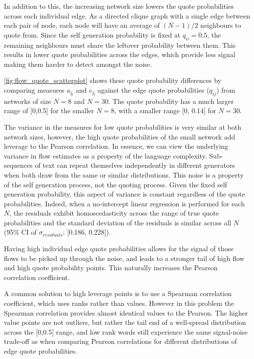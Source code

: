 In addition to this, the increasing network size lowers the quote probabilities across each individual edge. As a directed clique graph with a single edge between each pair of node, each node will have an average of $(N-1)/2$ neighbours to quote from. Since the self generation probability is fixed at $q_{ii}=0.5$, the remaining neighbours must share the leftover probability between them. This results in lower quote probabilities across the edges, which provide less signal making them harder to detect amongst the noise.

\autoref{fig:flow_quote_scatterplot} shows these quote probability differences by comparing measures $a_{\hat{h}}$ and $e_{\hat{h}}$ against the edge quote probabilities ($q_{ij}$) from networks of size $N=8$ and $N=30$. The quote probability has a much larger range of [0,0.5] for the smaller $N=8$, with a smaller range [0, 0.14] for $N=30$.

The variance in the measures for low quote probabilities is very similar at both network sizes, however, the high quote probabilities of the small network add leverage to the Pearson correlation. In essence, we can view the underlying variance in flow estimates as a property of the language complexity. Sub-sequences of text can repeat themselves independently in different generators when both draw from the same or similar distributions. This noise is a property of the self generation process, not the quoting process. Given the fixed self generation probability, this aspect of variance is constant regardless of the quote probabilities. Indeed, when a no-intercept linear regression is performed for each $N$, the residuals exhibit homoscedasticity across the range of true quote probabilities and the standard deviation of the residuals is similar across all $N$ (95\% CI of $\sigma_{residuals}$: [0.186, 0.228]). 

Having high individual edge quote probabilities allows for the signal of those flows to be picked up through the noise, and leads to a stronger tail of high flow and high quote probability points. This naturally increases the Pearson correlation coefficient.

A common solution to high leverage points is to use a Spearman correlation coefficient, which uses ranks rather than values. However in this problem the Spearman correlation provides almost identical values to the Pearson. The higher value points are not outliers, but rather the tail end of a well-spread distribution across the [0,0.5] range, and low rank words still experience the same signal-noise trade-off as when comparing Pearson correlations for different distributions of edge quote probabilities.


